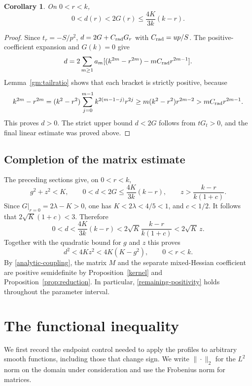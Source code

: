 \documentclass[11pt,letterpaper,reqno]{amsart}
\newtheorem{corollary}[theorem]{Corollary}
\theoremstyle{definition}
\begin{document}
\begin{corollary}
On $0<r<k$,
\[
 0<d(r)<2G(r)\le\frac{4K}{3k}(k-r).
\]
\end{corollary}
\begin{proof}
Since $t_r=-S/p^2$, $d=2G+C_{\rm rad} G_r$ with $C_{\rm rad}=up/S$.
The positive-coefficient expansion and $G(k)=0$ give
\[
 d=2\sum_{m\ge1}a_m
       [(k^{2m}-r^{2m})-mC_{\rm rad} r^{2m-1}].
\]
Lemma~\ref{gm:tailratio} shows that each bracket is strictly positive,
because
\[
 k^{2m}-r^{2m}
 =(k^2-r^2)\sum_{j=0}^{m-1}k^{2(m-1-j)}r^{2j}
 \ge m(k^2-r^2)r^{2m-2}>mC_{\rm rad} r^{2m-1}.
\]
This proves $d>0$. The strict upper bound $d<2G$ follows from
$tG_t>0$, and the final linear estimate was proved above.
\end{proof}

\subsection{Completion of the matrix estimate}
The preceding sections give, on $0<r<k$,
\[
 g^2+z^2<K,\qquad
 0<d<2G\le\frac{4K}{3k}(k-r),\qquad
 z>\frac{k-r}{k(1+c)}.
\]
Since $G|_{r=0}=2\lambda-K>0$, one has $K<2\lambda<4/5<1$, and $c<1/2$.
It follows that $2\sqrt K(1+c)<3$. Therefore
\[
 0<d<\frac{4K}{3k}(k-r)
 <2\sqrt K\frac{k-r}{k(1+c)}<2\sqrt K\,z.
\]
Together with the quadratic bound for $g$ and $z$ this proves
\begin{equation}\label{analytic-coupling}
 \boxed{\quad d^2<4Kz^2<4K(K-g^2),\qquad0<r<k.\quad}
\end{equation}
By \eqref{analytic-coupling}, the matrix $M$ and the separate mixed-Hessian
coefficient are positive semidefinite by Proposition~\ref{kernel}
and Proposition~\ref{prop:reduction}. In particular,
\eqref{remaining-positivity} holds throughout the parameter interval.
\section{The functional inequality}\label{sec:functional}
We first record the endpoint control needed to apply the profiles to
arbitrary smooth functions, including those that change sign. We write
$\|\cdot\|_2$ for the $L^2$ norm on the domain under consideration
and use the Frobenius norm for matrices.
\end{document}
